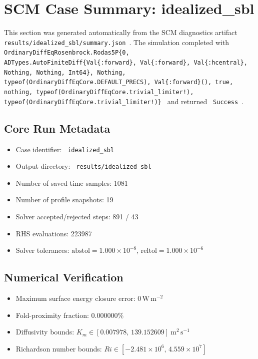 \section{SCM Case Summary: idealized\_sbl}
\label{sec:scm_case_idealized_sbl}

This section was generated automatically from the SCM diagnostics artifact
\texttt{ results/idealized\_sbl/summary.json }. The simulation completed with \texttt{ OrdinaryDiffEqRosenbrock.Rodas5P\{0, ADTypes.AutoFiniteDiff\{Val\{:forward\}, Val\{:forward\}, Val\{:hcentral\}, Nothing, Nothing, Int64\}, Nothing, typeof(OrdinaryDiffEqCore.DEFAULT\_PRECS), Val\{:forward\}(), true, nothing, typeof(OrdinaryDiffEqCore.trivial\_limiter!), typeof(OrdinaryDiffEqCore.trivial\_limiter!)\} }
and returned \texttt{ Success }.

\subsection{Core Run Metadata}
\begin{itemize}
  \item Case identifier: \texttt{ idealized\_sbl }
  \item Output directory: \texttt{ results/idealized\_sbl }
  \item Number of saved time samples: 1081
  \item Number of profile snapshots: 19
  \item Solver accepted/rejected steps: 891 / 43
  \item RHS evaluations: 223987
  \item Solver tolerances: $\mathrm{abstol}=1.000 \times 10^{-8}$, $\mathrm{reltol}=1.000 \times 10^{-6}$
\end{itemize}

\subsection{Numerical Verification}
\begin{itemize}
  \item Maximum surface energy closure error:
  $0\,\mathrm{W\,m^{-2}}$
  \item Fold-proximity fraction:
  $0.000000\%$
  \item Diffusivity bounds:
  $K_m \in [0.007978,\,139.152609]~\mathrm{m^2\,s^{-1}}$
  \item Richardson number bounds:
  $Ri \in [-2.481 \times 10^{6},\,4.559 \times 10^{7}]$
\end{itemize}

